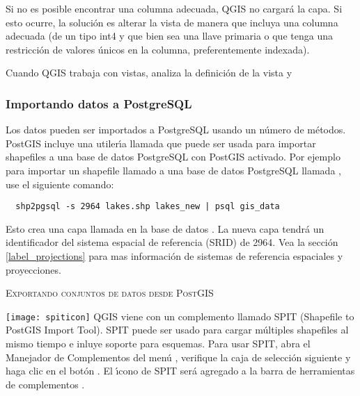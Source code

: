 Si no es posible encontrar una columna adecuada, QGIS no cargar\'a la capa. Si esto ocurre, la soluci\'on es alterar la vista de manera que incluya una columna adecuada (de un tipo int4 y que bien sea una llave primaria o que tenga una restricci\'on de valores \'unicos en la columna, preferentemente indexada). 

Cuando QGIS trabaja con vistas, analiza la definici\'on de la vista y 

\subsubsection{Importando datos a PostgreSQL}\label{sec:loading_postgis_data}  
Los datos pueden ser importados a PostgreSQL usando un n\'umero de m\'etodos. PostGIS
incluye una utiler\'{\i}a llamada  que puede ser usada para importar shapefiles a una base de datos PostgreSQL con PostGIS activado. Por ejemplo para importar un shapefile llamado  a una base de datos PostgreSQL llamada , use el siguiente comando:

\begin{verbatim} 
  shp2pgsql -s 2964 lakes.shp lakes_new | psql gis_data
\end{verbatim}

Esto crea una capa llamada  en la base de datos . La nueva capa tendr\'a un identificador del sistema espacial de referencia (SRID) de 2964. Vea la secci\'on \ref{label_projections} para mas informaci\'on de sistemas de referencia espaciales y proyecciones.

\begin{Tip}
\caption{\textsc{Exportando conjuntos de datos desde PostGIS}}
\end{Tip}

\texttt{[image: spiticon]} QGIS viene con un complemento llamado 
SPIT (Shapefile to PostGIS Import Tool).
SPIT puede ser usado para cargar m\'ultiples shapefiles al mismo tiempo e inluye soporte para esquemas. Para usar SPIT, abra el Manejador de Complementos del men\'u , verifique la caja de selecci\'on siguiente  y haga clic en el bot\'on . El \'{\i}cono de SPIT ser\'a agregado a la barra de herramientas de complementos . 

